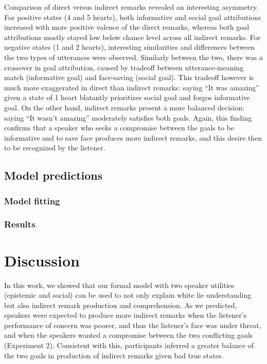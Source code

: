 \documentclass[10pt, letterpaper]{article}
\begin{document}
Comparison of direct versus indirect remarks revealed an interesting
asymmetry. For positive states (4 and 5 hearts), both informative and
social goal attributions increased with more positive valence of the
direct remarks, whereas both goal attributions mostly stayed low below
chance level across all indirect remarks. For negative states (1 and 2
hearts), interesting similarities and differences between the two types
of utterances were observed. Similarly between the two, there was a
crossover in goal attribution, caused by tradeoff between
utterance-meaning match (informative goal) and face-saving (social
goal). This tradeoff however is much more exaggerated in direct than
indirect remarks: saying ``It was amazing'' given a state of 1 heart
blatantly prioritizes social goal and forgos informative goal. On the
other hand, indirect remarks present a more balanced decision: saying
``It wasn't amazing'' moderately satisfies both goals. Again, this
finding confirms that a speaker who seeks a compromise between the goals
to be informative and to save face produces more indirect remarks, and
this desire then to be recognized by the listener.

\subsection{Model predictions}\label{model-predictions-1}

\subsubsection{Model fitting}\label{model-fitting-1}

\subsubsection{Results}\label{results-2}

\section{Discussion}\label{discussion}

In this work, we showed that our formal model with two speaker utilities
(epistemic and social) can be used to not only explain white lie
understanding but also indirect remark production and comprehension. As
we predicted, speakers were expected to produce more indirect remarks
when the listener's performance of concern was poorer, and thus the
listener's face was under threat, and when the speakers wanted a
compromise between the two conflicting goals (Experiment 2). Consistent
with this, participants inferred a greater balance of the two goals in
production of indirect remarks given bad true states.
\end{document}
